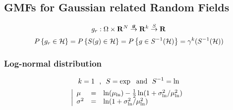 \documentclass[a4paper,12pt]{article}
\begin{document}
\subsection{GMFs for Gaussian related Random Fields}
\begin{equation}
  g_r : \Omega\times\mathbf{R}^N \overset{\boldsymbol{g}}{\rightarrow} \mathbf{R}^k \overset{S}{\rightarrow} \mathbf{R}
\end{equation}
\begin{equation}
    P\left\{g_r\in\mathcal{H}\right\} = P\left\{S(g)\in\mathcal{H}\right\} = P\left\{g\in S^{-1}(\mathcal{H})\right\} = \gamma^k(S^{-1}(\mathcal{H}))
\end{equation}

\subsubsection{Log-normal distribution}
\begin{equation}
  k=1 \ \ \text{,} \ \ \rfunc=\exp \ \ \text{and} \ \ \irfunc=\ln
\end{equation}
\begin{equation}
  \left|
  \begin{array}{lcl}
    \mu & = &\ln(\mu_{\ln}) - \frac{1}{2}\ln(1+\sigma_{\ln}^2/\mu_{\ln}^2) \\
    \sigma^2 & = & \ln(1+\sigma_{\ln}^2/\mu_{\ln}^2)
  \end{array}
  \right.
\end{equation}
\end{document}

